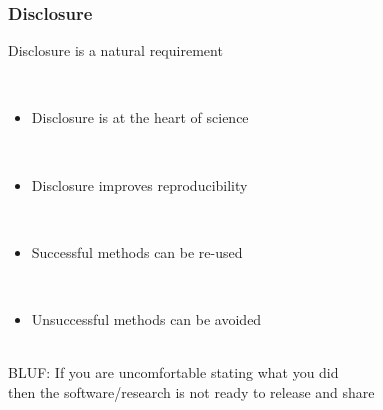 \documentclass{beamer}
\begin{document}
\begin{frame}
\begin{center}
\frametitle{Disclosure}

Disclosure is a natural requirement

~\\

\begin{itemize}

\item Disclosure is at the heart of science

~\\

\item Disclosure improves reproducibility

~\\

\item Successful methods can be re-used

~\\

\item Unsuccessful methods can be avoided

\end{itemize}

~\\

BLUF: If you are uncomfortable stating what you did\\
then the software/research is not ready to release and share

\end{center}
\end{frame}

\end{document}
